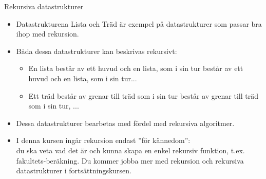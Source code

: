 \begin{Slide}{Rekursiva datastrukturer}

\begin{itemize}
\item Datastrukturena Lista och Träd är exempel på datastrukturer som passar bra ihop med rekursion.
\item Båda dessa datastrukturer kan beskrivas rekursivt:
\begin{itemize}
\item En lista består av ett huvud och en lista, som i sin tur består av ett huvud och en lista, som i sin tur...
\item Ett träd består av grenar till träd som i sin tur består av grenar till träd som i sin tur, ...
\end{itemize}
\item Dessa datastrukturer bearbetas med fördel med rekursiva algoritmer.
\item I denna kursen ingår rekursion endast ''för kännedom'': \\ du ska veta vad det är och kunna skapa en enkel rekursiv funktion, t.ex. fakultets-beräkning. Du kommer jobba mer med rekursion och rekursiva datastrukturer i fortsättningskursen.
\end{itemize}
\end{Slide}
